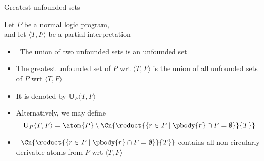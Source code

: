 \begin{frame}{Greatest unfounded sets}\label{unf:greatest}

Let $P$ be a normal logic program,\\ and let
$\langle T,F \rangle$ be a partial interpretation

\begin{itemize}
\item<2->  \ The union of two unfounded sets is an unfounded set
\item<3-> The \alert{greatest unfounded set} of $P$ wrt $\langle T,F \rangle$ is the
  union of all unfounded sets of $P$ wrt $\langle T,F \rangle$
\item<4-> [] It is denoted by $\mathbf{U}_P\langle T,F \rangle$
\item<5-> Alternatively, we may define
  \[
  \mathbf{U}_P\langle T,F \rangle =
  \atom{P} \setminus
  \Cn{\reduct{\{r \in P \mid \pbody{r} \cap F = \emptyset\}}{T}}\/
  \]
\item<6->  \
  \(
  \Cn{\reduct{\{r \in P \mid \pbody{r} \cap F = \emptyset\}}{T}}
  \)
  contains all non-circularly derivable atoms from $P$ wrt $\langle T,F \rangle$
\end{itemize}
\end{frame}
